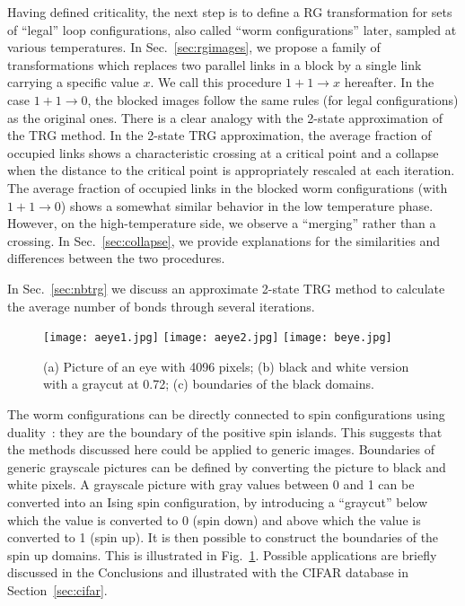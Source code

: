 \documentclass[../main.tex]{subfiles}
\begin{document}
Having defined criticality, the next step is to define a RG transformation for
sets of ``legal'' loop configurations, also called ``worm configurations''
later, sampled at various temperatures.
%
In Sec.~\ref{sec:rgimages},  we propose a family of transformations which
replaces two parallel links in a block by a single link carrying a specific
value $x$.  We call this procedure $1+1\rightarrow x$ hereafter.
%
In the case $1+1\rightarrow 0$, the blocked images follow the same rules (for
legal configurations) as the original ones.
%
There is a clear analogy with the 2-state approximation of the TRG method.
%
In the 2-state TRG approximation, the average fraction of occupied links shows
a characteristic crossing at a critical point and a collapse when the distance
to the critical point is appropriately rescaled at each iteration.
%
The average fraction of occupied links in the blocked worm configurations (with
$1+1\rightarrow 0$) shows a somewhat similar behavior in the low temperature
phase.
%
However, on the high-temperature side, we observe a ``merging'' rather than a
crossing.
%
In Sec.~\ref{sec:collapse},  we provide explanations for the similarities and
differences between the two procedures.

In Sec.~\ref{sec:nbtrg} we discuss an approximate 2-state TRG method to
calculate the average number of bonds through several iterations.
%
\begin{figure}[htpb]
    \centering 
    \texttt{[image: aeye1.jpg]}
    \hfill
    \texttt{[image: aeye2.jpg]}%
    \hfill
    \texttt{[image: beye.jpg]}%
    \hfill
    \caption{\label{fig:eye} (a) Picture of an eye with 4096 pixels; (b) black
    and white version with a graycut at 0.72; (c) boundaries of the black
    domains.}
\end{figure}
%
The worm configurations can be directly connected to spin configurations using
duality~\cite{RevModPhys.52.453}: they are the boundary of the positive spin
islands.
%
This suggests that the methods discussed here could be applied to generic
images.
%
Boundaries of generic grayscale pictures can be defined by converting the
picture to black and white pixels.
%
A grayscale picture with gray values between 0 and 1 can be converted into an
Ising spin configuration, by introducing a ``graycut'' below which the value is
converted to 0 (spin down) and above which the value is converted to 1 (spin
up).
%
It is then possible to construct the boundaries of the spin up domains.
%
This is illustrated in Fig.~\ref{fig:eye}.
%
Possible applications are briefly discussed in the Conclusions and illustrated
with the CIFAR database in Section~\ref{sec:cifar}. 
\end{document}
